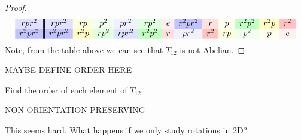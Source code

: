\documentclass{ximera}
\begin{document}
\begin{example}
\begin{proof}
\begin{gather*}
\begin{array}{c!{\vline width 2pt}cccccccccccc}
      rpr^2\cellcolor{blue!12!white}    & rpr^2\cellcolor{blue!12!white} & rp\cellcolor{yellow!12!white} & p^2\cellcolor{green!6!white} & pr^2\cellcolor{blue!6!white} & rp^2\cellcolor{green!12!white}& e\cellcolor{red!6!white} & r^2pr^2\cellcolor{blue!24!white} & r\cellcolor{red!12!white}  &  p \cellcolor{yellow!6!white}  & r^2p^2 \cellcolor{green!24!white}  &  r^2p \cellcolor{yellow!24!white}  & r^2 \cellcolor{red!24!white}\\
      r^2pr^2\cellcolor{blue!24!white}  & r^2pr^2\cellcolor{blue!24!white}& r^2p\cellcolor{yellow!24!white} & rp^2\cellcolor{green!12!white} & rpr^2\cellcolor{blue!12!white} & r^2p^2\cellcolor{green!24!white}& r\cellcolor{red!12!white} & pr^2\cellcolor{blue!6!white} & r^2\cellcolor{red!24!white}  &  rp \cellcolor{yellow!12!white}  & p^2 \cellcolor{green!6!white}  &  p \cellcolor{yellow!6!white}  & e \cellcolor{red!6!white}\\
    \end{array}
    \end{gather*}
    Note, from the table above we can see that $T_{12}$ is not Abelian.
  \end{proof}
\end{example}



MAYBE DEFINE ORDER HERE

\begin{exercise}
  Find the order of each element of $T_{12}$.
\end{exercise}


\begin{exercise}
  NON ORIENTATION PRESERVING 
\end{exercise}


\begin{question}
  This seems hard. What happens if we only study rotations in 2D?
\end{question}
\end{document}
